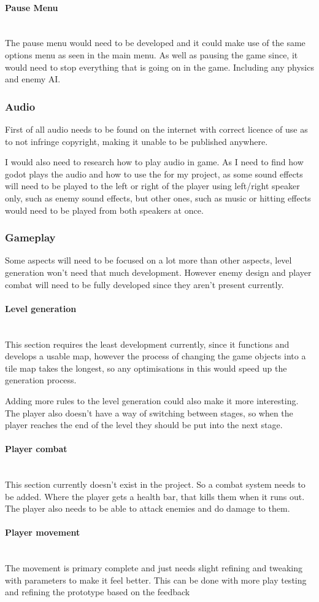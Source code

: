\documentclass{article}
\newcommand{\parBr}{\vspace{5mm}}%
\newcommand{\myparagraph}[1]{\paragraph{#1}\mbox{}\\} %
\begin{document}
\myparagraph{Pause Menu}
The pause menu would need to be developed and it could make use of the same options menu as seen in the main menu. As well as pausing the game since, it would need to stop everything that is going on in the game. Including any physics and enemy AI.

\subsubsection{Audio}
First of all audio needs to be found on the internet with correct licence of use as to not infringe copyright, making it unable to be published anywhere. 

\parBr

I would also need to research how to play audio in game. As I need to find how godot plays the audio and how to use the for my project, as some sound effects will need to be played to the left or right of the player using left/right speaker only, such as enemy sound effects, but other ones, such as music or hitting effects would need to be played from both speakers at once.

\subsubsection{Gameplay}
Some aspects will need to be focused on a lot more than other aspects, level generation won't need that much development. However enemy design and player combat will need to be fully developed since they aren't present currently.

\myparagraph{Level generation}
This section requires the least development currently, since it functions and develops a usable map, however the process of changing the game objects into a tile map takes the longest, so any optimisations in this would speed up the generation process. 

\parBr

Adding more rules to the level generation could also make it more interesting. The player also doesn't have a way of switching between stages, so when the player reaches the end of the level they should be put into the next stage.

\myparagraph{Player combat}
This section currently doesn't exist in the project. So a combat system needs to be added. Where the player gets a health bar, that kills them when it runs out. The player also needs to be able to attack enemies and do damage to them.

\myparagraph{Player movement}
The movement is primary complete and just needs slight refining and tweaking with parameters to make it feel better. This can be done with more play testing and refining the prototype based on the feedback
\end{document}
